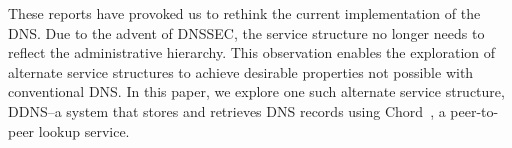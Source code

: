 These reports have provoked us to rethink the current 
implementation of the DNS. 
Due to the advent of DNSSEC, the service structure no longer needs
to reflect the administrative hierarchy. 
This observation enables the exploration of alternate service 
structures to achieve desirable properties not possible
with conventional DNS.  In this paper, we explore one such
alternate service structure, DDNS--a system that stores and retrieves
DNS records using Chord~\cite{chord:sigcomm}, a peer-to-peer
lookup service.

